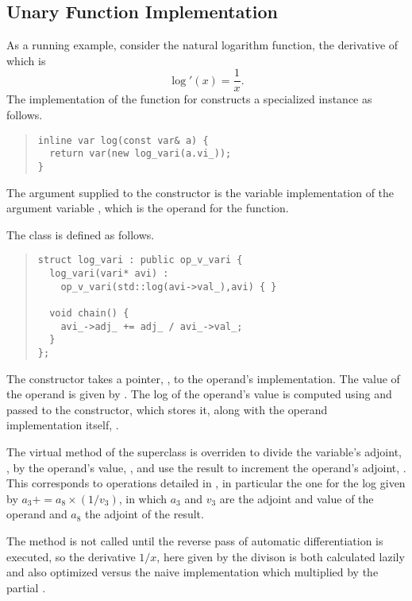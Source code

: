\documentclass[10pt]{article}
\begin{document}
\subsection{Unary Function Implementation}

As a running example, consider the natural logarithm function, the
derivative of which is
%
\[
\log'(x) = \frac{1}{x}.
\]
%
The implementation of the  function for 
constructs a specialized  instance as follows.
%
\begin{quote}
\begin{Verbatim}
inline var log(const var& a) {
  return var(new log_vari(a.vi_));
}
\end{Verbatim}
\end{quote}
%
The argument  supplied to the constructor is the variable
implementation of the argument variable , which is the operand
for the  function.

The class  is defined as follows.
%
\begin{quote}
\begin{Verbatim}
struct log_vari : public op_v_vari {
  log_vari(vari* avi) :
    op_v_vari(std::log(avi->val_),avi) { }

  void chain() {
    avi_->adj_ += adj_ / avi_->val_;
  }
};
\end{Verbatim}
\end{quote}
%
The constructor takes a pointer, , to the operand's
implementation.  The value of the operand is given by
.  The log of the operand's value is computed using
 and passed to the  constructor,
which stores it, along with the operand implementation itself,
.  

The virtual  method of the superclass 
is overriden to divide the variable's adjoint, , by the
operand's value, , and use the result to increment
the operand's adjoint, .  This corresponds to
\code{+=} operations detailed in , in
particular the one for the log given by $a_3 += a_8 \times (1 / v_3)$,
in which $a_3$ and $v_3$ are the adjoint and value of the operand and
$a_8$ the adjoint of the result.

The  method is not called until the reverse pass of
automatic differentiation is executed, so the derivative $1/x$, here
given by the divison  is both calculated lazily
and also optimized versus the naive implementation which multiplied
 by the partial .  
\end{document}
